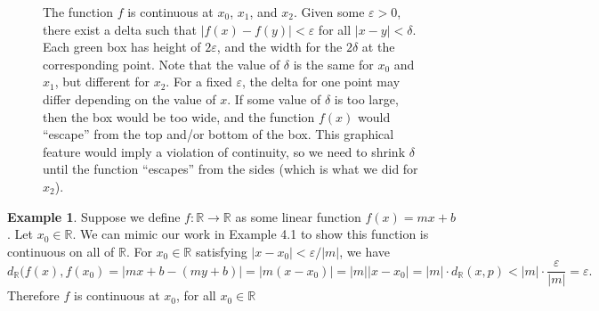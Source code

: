 \documentclass{article}
\newcommand{\R}{\mathbb{R}}
\theoremstyle{definition}
\newtheorem{example}{Example}[section]
\begin{document}
	\begin{figure}[h!]
		\centering
		\caption{The function $ f $ is continuous at $ x_0 $, $ x_1 $, and $ x_2 $. Given some $ \varepsilon>0 $, there exist a delta such that $ |f(x)-f(y)|<\varepsilon $ for all $ |x-y|<\delta $. Each green box has height of $ 2\varepsilon $, and the width for the $ 2\delta $ at the corresponding point. Note that the value of $ \delta $ is the same for $ x_0 $ and $ x_1 $, but different for $ x_2 $. For a fixed $ \varepsilon $, the delta for one point may differ depending on the value of $ x $. If some value of $ \delta $ is too large, then the box would be too wide, and the function $ f(x) $ would ``escape'' from the top and/or bottom of the box. This graphical feature would imply a violation of continuity, so we need to shrink $ \delta $ until the function ``escapes'' from the sides (which is what we did for $ x_2 $).   }
	\end{figure}
	\begin{example}
		Suppose we define $ f:\R\to\R $ as some linear function $ f(x)=mx+b $. Let $ x_0\in\R $. We can mimic our work in Example 4.1 to show this function is continuous on all of $ \R $. For $ x_0\in\R $ satisfying $ |x-x_0|<\varepsilon/|m| $, we have$$ d_\R(f(x),f(x_0)=|mx+b-(my+b)|=|m(x-x_0)|=|m||x-x_0|=|m|\cdot d_\R(x,p)<|m|\cdot\frac{\varepsilon}{|m|}=\varepsilon .$$ Therefore $ f $ is continuous at $ x_0 $, for all $ x_0\in\R $
	\end{example}
\end{document}
